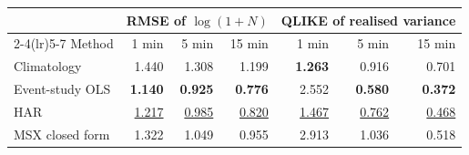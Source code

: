 \begin{tabular}{lrrrrrr}
\toprule
& \multicolumn{3}{c}{RMSE of $\log(1+N)$} & \multicolumn{3}{c}{QLIKE of realised variance} \\
\cmidrule(lr){2-4}\cmidrule(lr){5-7}
Method & 1 min & 5 min & 15 min & 1 min & 5 min & 15 min \\
\midrule
Climatology & 1.440 & 1.308 & 1.199 & \textbf{1.263} & 0.916 & 0.701 \\
Event-study OLS & \textbf{1.140} & \textbf{0.925} & \textbf{0.776} & 2.552 & \textbf{0.580} & \textbf{0.372} \\
HAR & \underline{1.217} & \underline{0.985} & \underline{0.820} & \underline{1.467} & \underline{0.762} & \underline{0.468} \\
\rowcolor{oursbg} MSX closed form & 1.322 & 1.049 & 0.955 & 2.913 & 1.036 & 0.518 \\
\bottomrule
\end{tabular}